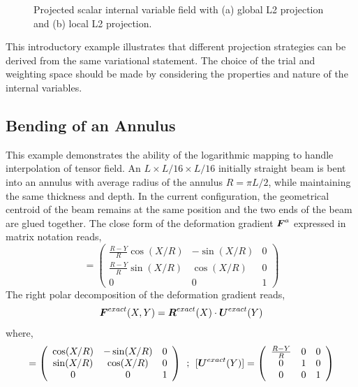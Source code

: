 \documentclass[12pt]{article}
\begin{document}
\begin{figure}[htbp]
  \begin{center}
    \unitlength=1.0mm
    \caption{Projected scalar internal variable field with (a) global L2 projection and (b) local L2 projection.}
    \label{fig:ExampleCube}
  \end{center}
\end{figure}

This introductory example illustrates that different projection
strategies can be derived from the same variational statement. The
choice of the trial and weighting space should be made by considering
the properties and nature of the internal variables.

\subsection{Bending of an Annulus}
This example demonstrates the ability of the logarithmic mapping 
to handle interpolation of tensor field. An $L \times L/16 \times L/16$ 
initially straight beam is bent into an annulus with average radius of the 
annulus $R = \pi L /2$, while maintaining the same thickness and depth. 
In the current configuration, the geometrical centroid of the beam remains 
at the same position and the two ends of the beam are glued together. The 
close form of the deformation gradient ${\boldsymbol{F}}^{a}$ expressed in matrix notation
 reads, 
 \begin{equation}
   [\bF^{exact}(X, Y)] =  \left( \begin{array}{ccc}
       \frac{R-Y}{R} \cos(X/R) & -\sin(X/R) & 0 \\
       \frac{R-Y}{R} \sin(X/R) & \cos(X/R)  & 0\\
       0 & 0 & 1 \end{array} \right)
\label{eq:DeformGrad} 
\end{equation}
The right polar decomposition of the deformation gradient reads,
\begin{equation}
  {\boldsymbol{F}}^{exact}(X,Y) = {\boldsymbol{R}}^{exact}(X) \cdot {\boldsymbol{U}}^{exact}(Y) 
  \label{eq:RightPolar}
\end{equation}
where,
\begin{equation}
  [\bR^{exact}(X)] =  \left( \begin{array}{ccc}
      \cos(X/R) & -\sin(X/R) & 0 \\
      \sin(X/R) & \cos(X/R)  & 0\\
      0 & 0 & 1 \end{array} \right) \: \: ; \: \:
  [\bU^{exact}(Y)] =  \left( \begin{array}{ccc}
      \frac{R-Y}{R}  & 0 & 0 \\
      0 & 1 & 0\\
      0 & 0 & 1 \end{array} \right)
  \label{eq:PolarDecomposition} 
\end{equation}
\end{document}
